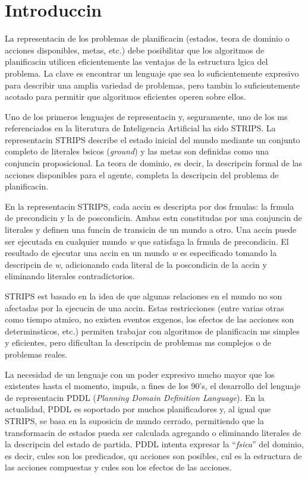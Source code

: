 \documentclass[a4paper,12pt,twocolumn]{article}
\begin{document}
\section{Introduccin}
\label{sec:introduccion}

  
La representacin de los problemas de planificacin (estados, teora de dominio o acciones disponibles, metas, etc.) debe posibilitar que los algoritmos de planificacin utilicen eficientemente las ventajas de la estructura lgica del problema. La clave es encontrar un lenguaje que sea lo suficientemente expresivo para describir una amplia variedad de problemas, pero tambin lo suficientemente acotado para permitir que algoritmos eficientes operen sobre ellos.

Uno de los primeros lenguajes de representacin y, seguramente, uno de los ms referenciados en la literatura de Inteligencia
Artificial ha sido STRIPS\cite{fn:str}. La representacin STRIPS describe el estado inicial del mundo mediante un conjunto completo de literales bsicos (\emph{ground}) y las metas son definidas como una conjuncin proposicional. La teora de dominio, es decir, la descripcin formal de las acciones disponibles para el agente, completa la descripcin del problema de planificacin.

En la representacin STRIPS, cada accin es descripta por dos frmulas: la frmula de precondicin y la de poscondicin. Ambas estn constitudas por una conjuncin de literales y definen una funcin de transicin de un mundo a otro. Una accin puede ser ejecutada en cualquier mundo \emph{w} que satisfaga la frmula de precondicin. El resultado de ejecutar una accin en un mundo \emph{w} es especificado tomando la descripcin de \emph{w}, adicionando cada literal de la poscondicin de la accin y eliminando literales contradictorios.


STRIPS est basado en la idea de que algunas relaciones en el mundo no son afectadas por la ejecucin de una accin. Estas restricciones (entre varias otras como tiempo atmico, no existen eventos exgenos, los efectos de las acciones son determinsticos, etc.) permiten trabajar con algoritmos de planificacin ms simples y eficientes, pero dificultan la descripcin de problemas ms complejos o de problemas reales.


La necesidad de un lenguaje con un poder expresivo mucho mayor que los existentes hasta el momento, impuls, a fines de los 90's, el desarrollo  del lenguaje de representacin PDDL (\emph{Planning Domain Definition Language})\cite{mder:pddl}. En la actualidad, PDDL es soportado por muchos planificadores y, al igual que STRIPS, se basa en la suposicin de mundo cerrado, permitiendo
que la transformacin de estados pueda ser calculada agregando o eliminando
literales de la descripcin del estado de partida.
PDDL intenta expresar la ``\emph{fsica}'' del dominio, es decir, cules son los predicados, qu acciones son posibles, cul es la estructura de las acciones compuestas y cules son los efectos de las acciones.
\end{document}
